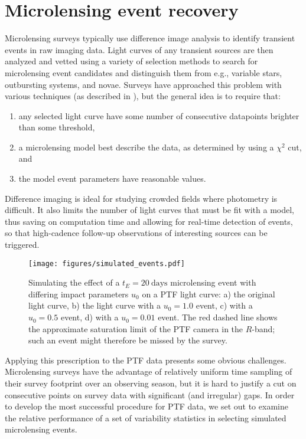 \documentclass{emulateapj}
\begin{document}
\section{Microlensing event recovery} \label{sec:event_recovery}
Microlensing surveys typically use difference image analysis \citep{alard1998} to identify transient events in raw imaging data. Light curves of any transient sources are then analyzed and vetted using a variety of selection methods to search for microlensing event candidates and distinguish them from e.g., variable stars, outbursting systems, and novae. Surveys have approached this problem with various techniques (as described in \citealt{ogle_optical_depth, con_idx, alcock2000, macho_detection_efficiency, hamadache2009, wyrzykowski2009, sumi2011}), but the general idea is to require that: 
\begin{enumerate}
	\item any selected light curve have some number of consecutive datapoints brighter than some threshold,
	\item a microlensing model best describe the data, as determined by using a $\chi^2$ cut, and
	\item the model event parameters have reasonable values.
\end{enumerate}
Difference imaging is ideal for studying crowded fields where photometry is difficult. It also limits the number of light curves that must be fit with a model, thus saving on computation time and allowing for real-time detection of events, so that high-cadence follow-up observations of interesting sources can be triggered. 

\begin{figure}[!t]
\centering\texttt{[image: figures/simulated\_events.pdf]}
\caption{Simulating the effect of a $t_E=20~\mathrm{days}$ microlensing event with differing impact parameters $u_0$ on a PTF light curve: a) the original light curve, b) the light curve with a $u_0=1.0$ event, c) with a $u_0=0.5$ event, d) with a $u_0=0.01$ event. The red dashed line shows the approximate saturation limit of the PTF camera in the $R$-band; such an event might therefore be missed by the survey.}\label{fig:microlensing_sim}
\end{figure}

Applying this prescription to the PTF data presents some obvious challenges. Microlensing surveys have the advantage of relatively uniform time sampling of their survey footprint over an observing season, but it is hard to justify a cut on consecutive points on survey data with significant (and irregular) gaps. In order to develop the most successful procedure for PTF data, we set out to examine the relative performance of a set of variability statistics in selecting simulated microlensing events.
\end{document}
